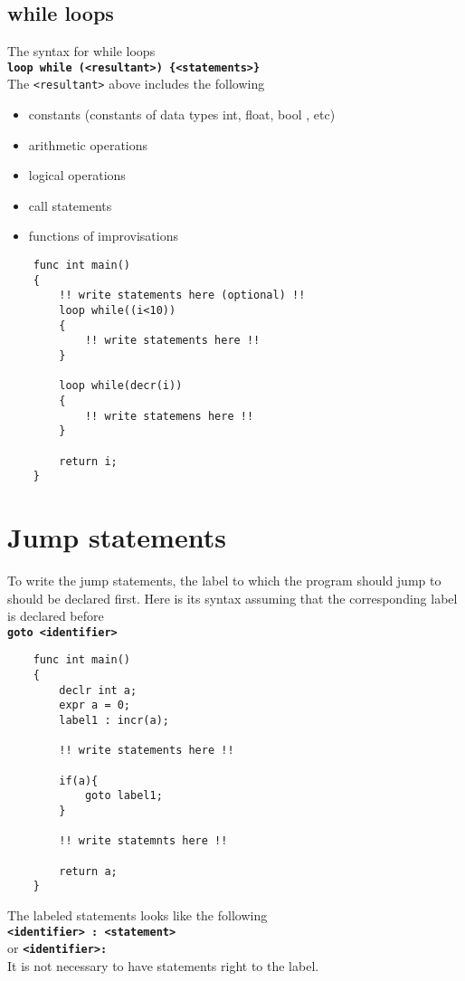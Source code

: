 \documentclass[journal, 18pt]{report}
\begin{document}
\subsection{while loops}
The syntax for while loops\\
\textbf{\texttt{loop while (<resultant>) \{<statements>\}}}\\
The \texttt{<resultant>} above includes the following
\begin{itemize}
    \item constants (constants of data types int, float, bool , etc)
        \item arithmetic operations
        \item logical operations
        \item call statements
        \item functions of improvisations
\end{itemize}
\begin{lstlisting}
    func int main()
    {
        !! write statements here (optional) !!
        loop while((i<10))
        {
            !! write statements here !!
        }

        loop while(decr(i))
        {
            !! write statemens here !!
        }

        return i;
    }
\end{lstlisting}
\section{Jump statements}
To write the jump statements, the label to which the program should jump to should be declared first. Here is its syntax assuming that the corresponding label is declared before\\
\textbf{\texttt{goto <identifier>}}
\begin{lstlisting}
    func int main()
    {
        declr int a;
        expr a = 0;
        label1 : incr(a);

        !! write statements here !!

        if(a){
            goto label1;
        }

        !! write statemnts here !!

        return a;
    }
\end{lstlisting}
The labeled statements looks like the following\\
\textbf{\texttt{<identifier> : <statement>}} 
\\ or
\textbf{\texttt{<identifier>: }}\\
It is not necessary to have statements right to the label.
\end{document}

